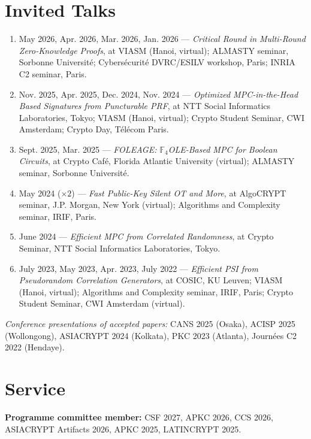 \documentclass[11pt]{article}
\begin{document}
\section{Invited Talks}
\begin{enumerate}
  \item May 2026, Apr. 2026, Mar. 2026, Jan. 2026 --- \emph{Critical Round in Multi-Round Zero-Knowledge Proofs}, at VIASM (Hanoi, virtual); ALMASTY seminar, Sorbonne Universit\'e; Cybers\'ecurit\'e DVRC/ESILV workshop, Paris; INRIA C2 seminar, Paris.
  \item Nov. 2025, Apr. 2025, Dec. 2024, Nov. 2024 --- \emph{Optimized MPC-in-the-Head Based Signatures from Puncturable PRF}, at NTT Social Informatics Laboratories, Tokyo; VIASM (Hanoi, virtual); Crypto Student Seminar, CWI Amsterdam; Crypto Day, T\'el\'ecom Paris.
  \item Sept. 2025, Mar. 2025 --- \emph{FOLEAGE: $\mathbb{F}_4$OLE-Based MPC for Boolean Circuits}, at Crypto Caf\'e, Florida Atlantic University (virtual); ALMASTY seminar, Sorbonne Universit\'e.
  \item May 2024 ($\times 2$) --- \emph{Fast Public-Key Silent OT and More}, at AlgoCRYPT seminar, J.P. Morgan, New York (virtual); Algorithms and Complexity seminar, IRIF, Paris.
  \item June 2024 --- \emph{Efficient MPC from Correlated Randomness}, at Crypto Seminar, NTT Social Informatics Laboratories, Tokyo.
  \item July 2023, May 2023, Apr. 2023, July 2022 --- \emph{Efficient PSI from Pseudorandom Correlation Generators}, at COSIC, KU Leuven; VIASM (Hanoi, virtual); Algorithms and Complexity seminar, IRIF, Paris; Crypto Student Seminar, CWI Amsterdam (virtual).
\end{enumerate}

\smallskip
\textit{Conference presentations of accepted papers:} CANS 2025 (Osaka), ACISP 2025 (Wollongong),
ASIACRYPT 2024 (Kolkata), PKC 2023 (Atlanta), Journ\'ees C2 2022 (Hendaye).

\section{Service}

\textbf{Programme committee member:} CSF 2027, APKC 2026, CCS 2026, ASIACRYPT Artifacts 2026,
APKC 2025, LATINCRYPT 2025.
\end{document}
